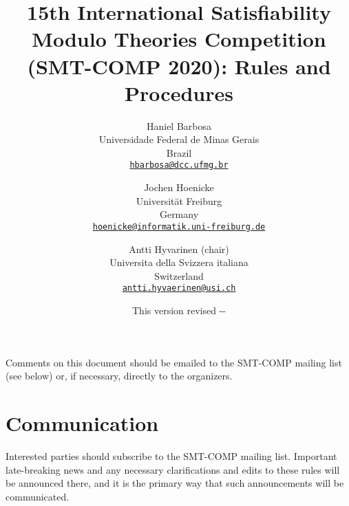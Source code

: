 \documentclass[12pt]{article}
\begin{document}
\date{\small This version revised \the\year-\the\month-\the\day}

\title{15th International Satisfiability Modulo Theories Competition
  (SMT-COMP 2020): Rules and Procedures}

\def\doauthor#1{{%
  \hsize.5\hsize \advance\hsize by-1cm %
  \def\\{\hss\egroup\hbox to\hsize\bgroup\strut\hss}%
  \vbox{\hbox to\hsize\bgroup\strut\hss#1\hss\egroup}}}%

\def\header#1{\medskip\noindent\textbf{#1}}

\author{%
Haniel Barbosa\\
Universidade Federal de Minas Gerais\\
Brazil\\
{\small\href{mailto:hbarbosa@dcc.ufmg.br}{\texttt{hbarbosa@dcc.ufmg.br}}}\\
\and
Jochen Hoenicke\\
Universit\"at Freiburg\\
Germany\\
{\small\href{mailto:hoenicke@informatik.uni-freiburg.de}{\texttt{hoenicke@informatik.uni-freiburg.de}}}\\
\and
Antti Hyvarinen (chair)\\
Universita della Svizzera italiana \\
Switzerland \\
{\small\href{mailto:antti.hyvaerinen@usi.ch}{\texttt{antti.hyvaerinen@usi.ch}}} \\
}

\maketitle

\noindent Comments on this document should be emailed to the SMT-COMP
mailing list (see below) or, if necessary, directly to the organizers.


\section{Communication}

Interested parties should subscribe to the SMT-COMP mailing list.
Important late-breaking news and any necessary clarifications and
edits to these rules will be announced there, and it is the primary
way that such announcements will be communicated.
\end{document}
